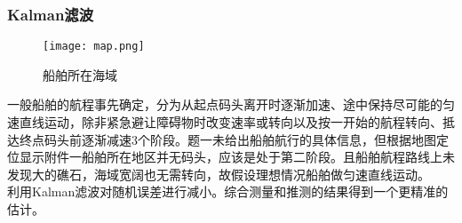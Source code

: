 \subsubsection{Kalman滤波}
\begin{figure}[htbp]
	\centering
	\caption{船舶所在海域}
	\texttt{[image: map.png]}
\end{figure}
\par 一般船舶的航程事先确定，分为从起点码头离开时逐渐加速、途中保持尽可能的匀速直线运动，除非紧急避让障碍物时改变速率或转向以及按一开始的航程转向、抵达终点码头前逐渐减速3个阶段。题一未给出船舶航行的具体信息，但根据地图定位显示附件一船舶所在地区并无码头，应该是处于第二阶段。且船舶航程路线上未发现大的礁石，海域宽阔也无需转向，故假设理想情况船舶做匀速直线运动。
\\\indent 利用Kalman滤波对随机误差进行减小。综合测量和推测的结果得到一个更精准的估计。
